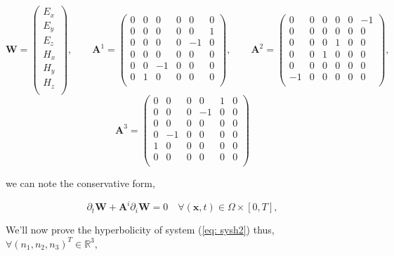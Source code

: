 \documentclass[a4paper,oneside,10pt]{report}
\begin{document}
\begin{equation}
\mathbf{W}=
\begin{pmatrix}
E_x\\
E_y\\
E_z\\
H_x\\
H_y\\
H_z\\
\end{pmatrix},
\qquad
\mathbf{A}^1=
\begin{pmatrix}
0 & 0 & 0 & 0 & 0 & 0\\
0 & 0 & 0 & 0 & 0 & 1\\
0 & 0 & 0 & 0 & -1 & 0\\
0 & 0 & 0 & 0 & 0 & 0\\
0 & 0 & -1 & 0 & 0 & 0\\
0 & 1 & 0 & 0 & 0 & 0\\
\end{pmatrix},
\qquad
\mathbf{A}^2=
\begin{pmatrix}
0 & 0 & 0 & 0 & 0 & -1\\
0 & 0 & 0 & 0 & 0 & 0\\
0 & 0 & 0 & 1 & 0 & 0\\
0 & 0 & 1 & 0 & 0 & 0\\
0 & 0 & 0 & 0 & 0 & 0\\
-1 & 0 & 0 & 0 & 0 & 0\\
\end{pmatrix},
\end{equation}
\begin{equation}
\mathbf{A}^3=
\begin{pmatrix}
0 & 0 & 0 & 0 & 1 & 0\\
0 & 0 & 0 & -1 & 0 & 0\\
0 & 0 & 0 & 0 & 0 & 0\\
0 & -1 & 0 & 0 & 0 & 0\\
1 & 0 & 0 & 0 & 0 & 0\\
0 & 0 & 0 & 0 & 0 & 0\\
\end{pmatrix}
\end{equation}


we can note the conservative form,

\begin{equation}
\label{eq:sysh44}
\partial_t \mathbf{W} +  \mathbf{A}^i\partial_i \mathbf{W} = 0 \quad \forall (\mathbf{x},t) \in \Omega \times [0,T],
\end{equation}

We'll now prove the hyperbolicity of system (\ref{eq: sysh2}) thus, $\forall (n_1,n_2,n_3)^T \in \mathbb{R}^3$,
\end{document}
